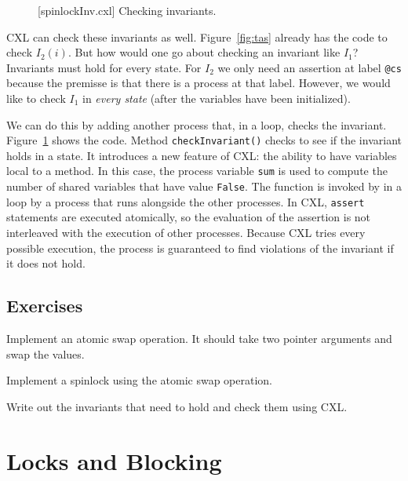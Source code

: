 \documentclass{report}
\newenvironment{code}{
\tcolorbox
}{
\endtcolorbox
}
\begin{document}
\begin{figure}
\begin{code}
\end{code}
\caption{[spinlockInv.cxl] Checking invariants.}
\label{fig:tasinv}
\end{figure}

CXL can check these invariants as well.  Figure~\ref{fig:tas} already
has the code to check $I_2(i)$.  But how would one go about checking an
invariant like $I_1$?  Invariants must hold for every state.
For $I_2$ we only need an assertion at label \texttt{@cs} because the
premisse is that there is a process at that label.  However, we would
like to check $I_1$ in \emph{every state} (after the variables have
been initialized).

We can do this by adding another process that, in a loop,
checks the invariant.  Figure~\ref{fig:tasinv} shows the code.
Method \texttt{checkInvariant()} checks to see if the invariant holds
in a state.  It introduces a new feature of CXL: the ability to have
variables local to a method.  In this case, the process variable \texttt{sum}
is used to compute the number of shared variables that have value
\texttt{False}.
The function is invoked by in a loop by a process that runs alongside
the other processes.
In CXL, \texttt{assert} statements are executed atomically, so the
evaluation of the assertion is not interleaved with the execution
of other processes.
Because CXL tries every possible execution, the process is guaranteed
to find violations of the invariant if it does not hold.

\section*{Exercises}
\begin{problems}
\item Implement an atomic swap operation.  It should take two pointer arguments
and swap the values.
\item Implement a spinlock using the atomic swap operation.
\item Write out the invariants that need to hold and check them using CXL.
\end{problems}

\chapter{Locks and Blocking}
\label{ch:synch}
\end{document}
